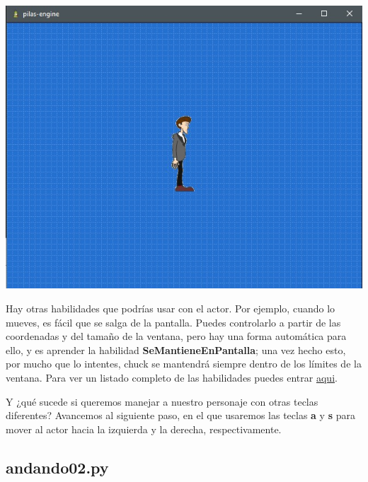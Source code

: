 \documentclass{article}
\begin{document}
\vspace{\baselineskip}
\includegraphics[width=\textwidth]{andando01}
\vspace{\baselineskip}

Hay otras habilidades que podrías usar con el actor. Por ejemplo, cuando lo mueves, es fácil que se salga de la pantalla. Puedes controlarlo a partir de las coordenadas y del tamaño de la ventana, pero hay una forma automática para ello, y es aprender la habilidad \textbf{SeMantieneEnPantalla}; una vez hecho esto, por mucho que lo intentes, chuck se mantendrá siempre dentro de los límites de la ventana. Para ver un listado completo de las habilidades puedes entrar \href{http://manual.pilas-engine.com.ar/habilidades/#listado-de-habilidades-existentes}{aqui}.\par
Y ¿qué sucede si queremos manejar a nuestro personaje con otras teclas diferentes? 
Avancemos al siguiente paso, en el que usaremos las teclas \textbf{a} y \textbf{s} para mover al actor hacia la izquierda y la derecha, respectivamente.\par
\vspace{\baselineskip}

\subsection{andando02.py}
\end{document}
